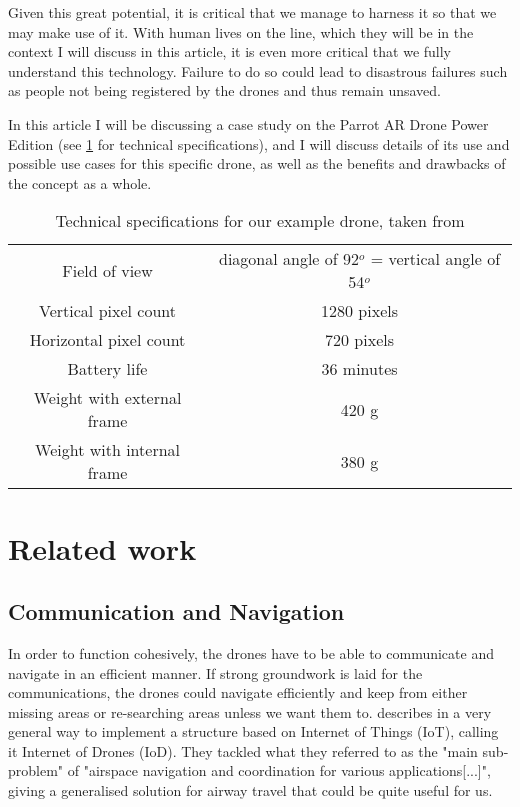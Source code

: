 \documentclass[fleqn,10pt]{wlscirep}
\newcommand{\citesup}[1]{\textsuperscript{\cite{#1}}}
\begin{document}
Given this great potential, it is critical that we manage to harness it so that we may make use of it. With human lives on the line, which they will be in the context I will discuss in this article, it is even more critical that we fully understand this technology. Failure to do so could lead to disastrous failures such as people not being registered by the drones and thus remain unsaved.

In this article I will be discussing a case study on the Parrot AR Drone Power Edition\citesup{Parrot_webpage} (see \cref{tab:parrot specs} for technical specifications), and I will discuss details of its use and possible use cases for this specific drone, as well as the benefits and drawbacks of the concept as a whole.

\begin{table}[h]
\centering
\caption{Technical specifications for our example drone, taken from \cite{Parrot_webpage}}
\label{tab:parrot specs}
\begin{tabular}{|c|c|}
  \hline
  Field of view & diagonal angle of 92$^o$ = vertical angle of 54$^o$ \\
  Vertical pixel count & 1280 pixels\\
  Horizontal pixel count & 720 pixels \\
  Battery life & 36 minutes \\
  Weight with external frame & 420 g \\
  Weight with internal frame & 380 g \\
  \hline
\end{tabular}
\end{table}



\section{Related work}
\subsection{Communication and Navigation} \label{sec:Communication and navigation}
In order to function cohesively, the drones have to be able to communicate and navigate in an efficient manner. If strong groundwork is laid for the communications, the drones could navigate efficiently and keep from either missing areas or re-searching areas unless we want them to. \cite{Internet_of_Drones} describes in a very general way to implement a structure based on Internet of Things (IoT), calling it Internet of Drones (IoD). They tackled what they referred to as the "main sub-problem" of "airspace navigation and coordination for various applications[...]"\citesup{Internet_of_Drones}, giving a generalised solution for airway travel that could be quite useful for us.
\end{document}
